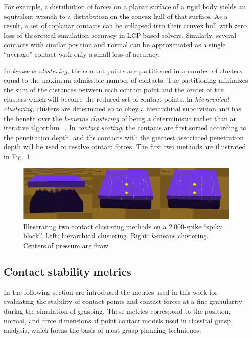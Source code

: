For example, a distribution of forces on a planar surface of a rigid body yields an equivalent wrench to a distribution on the convex hull of that surface. As a result, a set of coplanar contacts can be collapsed into their convex hull with zero loss of theoretical simulation accuracy in LCP-based solvers.  Similarly, several contacts with similar position and normal can be approximated as a single ``average'' contact with only a small loss of accuracy.

In \emph{k-means clustering}, the contact points are partitioned in a number of clusters equal to the maximum admissible number of contacts. The partitioning minimizes the sum of the distances between each contact point and the center of the clusters which will become the reduced set of contact points.
In \emph{hierarchical clustering}, clusters are determined so to obey a hierarchical subdivision and has the benefit over the \emph{k-means clustering} of being a deterministic rather than an iterative algorithm ~\cite{Rokach10}.
In \emph{contact sorting}, the contacts are first sorted according to the penetration depth, and the contacts with the greatest associated penetration depth will be used to resolve contact forces. The first two methods are illustrated in Fig.~\ref{fig:clustering}.


\begin{figure}[!hbt]
\begin{center}
        \includegraphics[width=0.95\columnwidth]     {images/ssoch/clustering}
        \caption{Illustrating two contact clustering methods on a 2,000-spike ``spiky block''. Left: hierarchical clustering.  Right: $k$-means clustering. Centers of pressure are draw}
        \label{fig:clustering}
        \end{center}
\end{figure}


\subsection{Contact stability metrics}

In the following section are introduced the metrics used in this work for evaluating the stability of contact points and contact forces at a fine granularity during the simulation of grasping.  These metrics correspond to the position, normal, and force dimensions of point contact models used in classical grasp analysis, which forms the basis of most grasp planning techniques.

